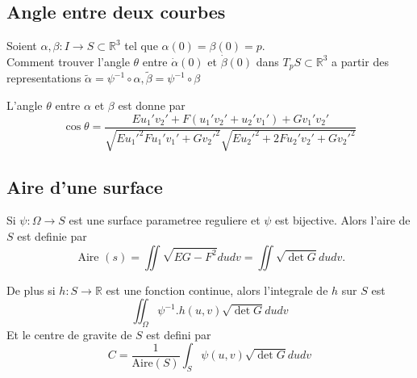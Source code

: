 \documentclass[../main.tex]{subfiles}
\begin{document}
\subsection{Angle entre deux courbes}
Soient $\alpha,\beta: I \to S \subset \mathbb{R}^{3} $ tel que $\alpha( 0) = \beta( 0) = p$.\\
Comment trouver l'angle $\theta$ entre $\dot\alpha( 0) $ et $\dot\beta( 0) $ dans $T_pS \subset \mathbb{R}^{3} $ a partir des representations $\tilde\alpha= \psi^{-1}\circ\alpha, \tilde\beta= \psi^{-1}\circ \beta$ 
\begin{propo}
L'angle $\theta $ entre $\alpha$ et $\beta$ est donne par
\[ 
\cos\theta = \frac{Eu_1'v_2' + F (   u_1'v_2'+ u_2'v_1'	) + Gv_1'v_2'	 }{ \sqrt{ E u_1'^{2} F u_1'v_1'+ Gv_2'^{2}} \sqrt{ E u_2'^{2}+ 2 F u_2'v_2'+ Gv_2'^{2}} }
\]

\end{propo}
	
\subsection{Aire d'une surface}
\begin{defn}
	Si $\psi: \Omega \to S$ est une surface parametree reguliere et $\psi$ est bijective. Alors l'aire de $S$ est definie par
	\[ 
	\text{ Aire } ( s) = \iint \sqrt{EG- F^{2}} du dv = \iint \sqrt{ \det G} du dv.
	\]
	
\end{defn}
De plus si $h: S \to \mathbb{R}$ est une fonction continue, alors l'integrale de $h$ sur $S$ est
\[ 
\iint_{\Omega} \psi^{-1}.h( u,v) \sqrt{\det G} du dv 
\]
Et le centre de gravite de $S$ est defini par
\[ 
C = \frac{1}{ \mathrm{Aire}( S) }  \int_{ S }^{  } \psi( u,v)  \sqrt{\det G} du dv
\]



		
\end{document}
